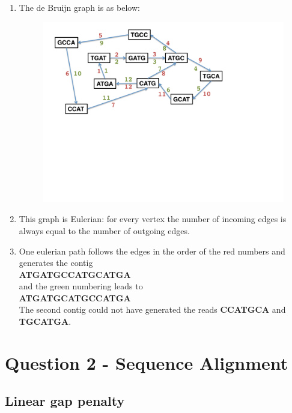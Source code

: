 \documentclass[a4paper,11pt]{article}
\begin{document}
\begin{enumerate}
\item The de Bruijn graph is as below:
\begin{figure}[h]
\centering\includegraphics[scale=.8]{Bruijn.pdf}
\end{figure}

\item This graph is Eulerian: for every vertex the number of
  incoming edges is always equal to the number of outgoing edges.

\item 
One eulerian path follows the edges in the order of the red numbers
and generates the contig\\
\textbf{ATGATGCCATGCATGA}\\
and the green numbering leads to\\
\textbf{ATGATGCATGCCATGA}\\

The second contig could not have generated the reads \textbf{CCATGCA}
and \textbf{TGCATGA}.
\end{enumerate}


\section*{Question 2 - Sequence Alignment}

\subsection*{Linear gap penalty}
\end{document}
